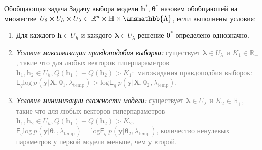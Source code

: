 \documentclass[usenames,dvipsnames,11pt,pdf,utf8,russian,aspectratio=43]{beamer}
\begin{document}
                                                                                                              


   
\begin{frame}{Обобщающая задача}
\footnotesize
Задачу выбора модели $\mathbf{h}^{*}, \boldsymbol{\theta}^{*}$ назовем обобщаюшей на множестве $U_{\theta}\times U_{h} \times U_{\lambda} \subset \mathbb{R}^{u} \times \mathbb{H} \times \amsmathbb{\Lambda}$, если выполнены условия:
\begin{enumerate}
\item Для каждого $\mathbf{h} \in U_h$ и каждого $\boldsymbol{\lambda} \in U_{\lambda}$ решение $\boldsymbol{\theta}^{*}$ определено однозначно.
\item \textit{Условие максимизации правдоподобия выборки:}\textcolor{gray}{ существует $\boldsymbol{\lambda} \in U_{\lambda}$ и  $K_1 \in \mathbb{R}_{+}$, такие что для любых векторов гиперпараметров $\mathbf{h}_1, \mathbf{h}_2 \in  U_{h}, Q(\mathbf{h}_1) - Q(\mathbf{h}_2) > K_1:$ матожидания правдоподбия выборок: $\mathsf{E}_q \text{log}~p(\mathbf{y}|\mathbf{X}, \boldsymbol{\theta}_1, \lambda_{\text{temp}})>\text{log}\mathsf{E}_q ~p(\mathbf{y}|\mathbf{X}, \boldsymbol{\theta}_2, \lambda_{\text{temp}})$.}

\item \textit{Условие минимизации сложности модели:}\textcolor{gray}{ существует  $\boldsymbol{\lambda} \in U_{\lambda}$ и $K_2 \in \mathbb{R}_{+}$, такие что для любых векторов гиперпараметров $\mathbf{h}_1, \mathbf{h}_2 \in U_h, Q(\mathbf{h}_1) - Q(\mathbf{h}_2) > K_2$,  $\mathsf{E}_q \text{log}~p(\mathbf{y}|\boldsymbol{\theta}_1, \lambda_{\text{temp}}) = \text{log}\mathsf{E}_q ~p(\mathbf{y}|\boldsymbol{\theta}_2, \lambda_{\text{temp}})$, количество ненулевых параметров у первой модели меньше, чем у второй.}


\end{enumerate}
\end{frame}
\end{document}

